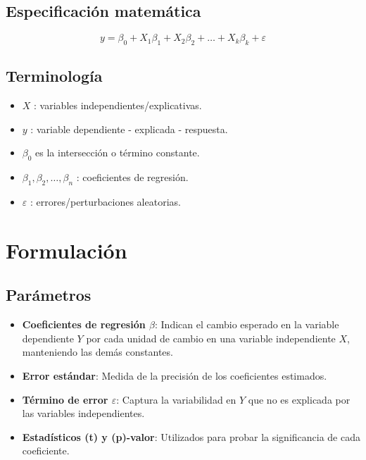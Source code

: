 \documentclass[
  letterpaper,
  DIV=11,
  numbers=noendperiod]{scrreprt}
\providecommand{\tightlist}{%
  \setlength{\itemsep}{0pt}\setlength{\parskip}{0pt}}\usepackage{longtable,booktabs,array}
\begin{document}
\subsection{Especificación
matemática}\label{especificaciuxf3n-matemuxe1tica-1}

\[
y = \beta_0 +  X_1 \beta_1 + X_2 \beta_2 + \dots + X_k\beta_k + \varepsilon
\]

\subsection{Terminología}\label{terminologuxeda-1}

\begin{itemize}
\tightlist
\item
  \(X\) : variables independientes/explicativas.
\item
  \(y\) : variable dependiente - explicada - respuesta.
\item
  \(\beta_0\) es la intersección o término constante.
\item
  \(\beta_1, \beta_2, \dots, \beta_n\) : coeficientes de regresión.
\item
  \(\varepsilon\) : errores/perturbaciones aleatorias.
\end{itemize}

\section{Formulación}\label{formulaciuxf3n-4}

\subsection{Parámetros}\label{paruxe1metros}

\begin{itemize}
\tightlist
\item
  \textbf{Coeficientes de regresión \(\beta\)}: Indican el cambio
  esperado en la variable dependiente \(Y\) por cada unidad de cambio en
  una variable independiente \(X\), manteniendo las demás constantes.
\item
  \textbf{Error estándar}: Medida de la precisión de los coeficientes
  estimados.
\item
  \textbf{Término de error \(\varepsilon\)}: Captura la variabilidad en
  \(Y\) que no es explicada por las variables independientes.
\item
  \textbf{Estadísticos (t) y (p)-valor}: Utilizados para probar la
  significancia de cada coeficiente.
\end{itemize}
\end{document}
